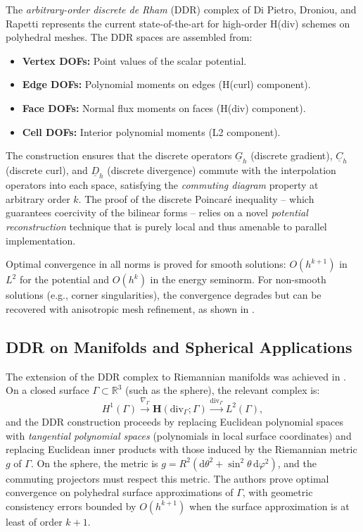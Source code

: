 The \emph{arbitrary-order discrete de Rham} (DDR) complex of Di Pietro,
Droniou, and Rapetti \cite{dipietroDDR2021} represents the current
state-of-the-art for high-order H(div) schemes on polyhedral meshes.
The DDR spaces are assembled from:
\begin{itemize}[nosep]
  \item \textbf{Vertex DOFs:} Point values of the scalar potential.
  \item \textbf{Edge DOFs:} Polynomial moments on edges (H(curl) component).
  \item \textbf{Face DOFs:} Normal flux moments on faces (H(div) component).
  \item \textbf{Cell DOFs:} Interior polynomial moments (L2 component).
\end{itemize}
The construction ensures that the discrete operators $\underline{G}_h$
(discrete gradient), $\underline{C}_h$ (discrete curl), and
$\underline{D}_h$ (discrete divergence) commute with the interpolation
operators into each space, satisfying the \emph{commuting diagram} property
at arbitrary order $k$. The proof of the discrete Poincar\'{e} inequality
-- which guarantees coercivity of the bilinear forms -- relies on a novel
\emph{potential reconstruction} technique that is purely local and thus
amenable to parallel implementation.

Optimal convergence in all norms is proved for smooth solutions:
$O(h^{k+1})$ in $L^2$ for the potential and $O(h^k)$ in the energy seminorm.
For non-smooth solutions (e.g., corner singularities), the convergence
degrades but can be recovered with anisotropic mesh refinement, as shown
in \cite{dipietroHHO2015}.

\subsection{DDR on Manifolds and Spherical Applications}

The extension of the DDR complex to Riemannian manifolds was achieved in
\cite{dipietroManifold2024}. On a closed surface $\Gamma\subset\mathbb{R}^3$
(such as the sphere), the relevant complex is:
\[
  H^1(\Gamma) \xrightarrow{\nabla_\Gamma}
  \mathbf{H}(\mathrm{div}_\Gamma;\Gamma) \xrightarrow{\mathrm{div}_\Gamma}
  L^2(\Gamma),
\]
and the DDR construction proceeds by replacing Euclidean polynomial spaces
with \emph{tangential polynomial spaces} (polynomials in local surface
coordinates) and replacing Euclidean inner products with those induced by
the Riemannian metric $g$ of $\Gamma$. On the sphere, the metric is
$g = R^2(\mathrm{d}\theta^2 + \sin^2\theta\, \mathrm{d}\varphi^2)$, and the
commuting projectors must respect this metric. The authors prove optimal
convergence on polyhedral surface approximations of $\Gamma$, with geometric
consistency errors bounded by $O(h^{k+1})$ when the surface approximation
is at least of order $k+1$.

